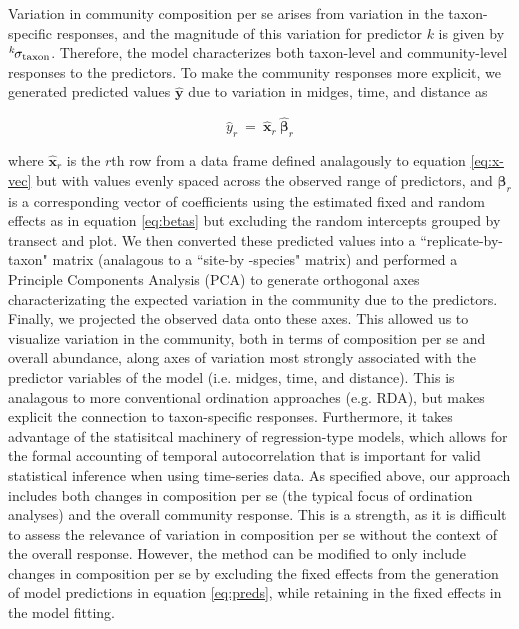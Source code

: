 {Variation in community composition per se arises from variation in the taxon-specific responses, and the magnitude of this
variation for predictor $k$ is given by ${}^k\hspace*{-1pt}\sigma_\text{taxon}$. Therefore, the model characterizes both
taxon-level and community-level responses to the predictors. To make the community responses more explicit, we
generated predicted values $\hat{\mathbf{y}}$ due to variation in midges, time, and distance as

\begin{equation} \label{eq:preds}
\hat{y}_r~=~\hat{\mathbf{x}}_r~\hat{{\boldsymbol\beta}}_r
\end{equation}

\noindent where $\hat{\mathbf{x}}_r$ is the $r$th row from a data frame defined analagously to equation \ref{eq:x-vec} but with
values evenly spaced across the observed range of predictors, and $\hat{{\boldsymbol\beta}}_r$ is a corresponding vector of
coefficients using the estimated fixed and random effects as in equation \ref{eq:betas} but excluding the random intercepts grouped
by transect and plot. We then converted these predicted values into a ``replicate-by-taxon" matrix (analagous to a ``site-by
-species" matrix) and performed a Principle Components Analysis (PCA) to generate orthogonal axes characterizating the expected
variation in the community due to the predictors. Finally, we projected the observed data onto these axes. This allowed us to
visualize variation in the community, both in terms of composition per se and overall abundance, along axes of variation most
strongly associated with the predictor variables of the model (i.e. midges, time, and distance). This is analagous to more
conventional ordination approaches (e.g. RDA), but makes explicit the connection to taxon-specific responses. Furthermore, it takes
advantage  of the statisitcal machinery of regression-type models, which allows for the formal accounting of temporal
autocorrelation that is important for valid statistical inference when using time-series data. As specified above, our approach
includes both changes in composition per se (the typical focus of ordination analyses) and the overall community response. This is a
strength, as it is difficult to assess the relevance of variation in composition per se without the context of the overall response.
However, the method can be modified to only include changes in composition per se by excluding the fixed effects from the generation
of model predictions in equation \ref{eq:preds}, while retaining in the fixed effects in the model fitting.

}

